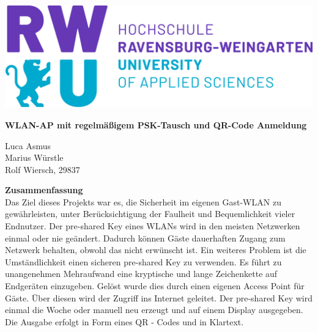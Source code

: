 \documentclass[a4paper,11pt,singlespacing]{article}
\begin{document}
    
 
	\setlength{\parindent}{0ex}
	
    	
    	
\begin{titlepage}
    \begin{center}
    \includegraphics[scale=0.3]{rwu_logo_hor-lila-cyan_rgb_0}
        \vspace*{1.5cm}
        
        \Huge
        \textbf{WLAN-AP mit regelmäßigem PSK-Tausch und QR-Code Anmeldung}
            
        \vspace{1.4cm}
        \normalsize
        Luca Asmus\\ Marius Würstle\\Rolf Wiersch, 29837
            
        \vspace{1.0cm}
        
          \normalsize
        \textbf{Zusammenfassung}\\
    	Das Ziel dieses Projekts war es, die Sicherheit im eigenen Gast-WLAN zu gewährleisten, unter Berücksichtigung der Faulheit und Bequemlichkeit vieler Endnutzer. Der pre-shared Key eines WLANs wird in den meisten Netzwerken einmal oder nie geändert. Dadurch können Gäste dauerhaften Zugang zum Netzwerk behalten, obwohl das nicht erwünscht ist. Ein weiteres Problem ist die Umständlichkeit einen sicheren pre-shared Key zu verwenden. Es führt zu unangenehmen Mehraufwand eine kryptische und lange Zeichenkette auf Endgeräten einzugeben. Gelöst wurde dies durch einen eigenen Access Point für Gäste. Über diesen wird der Zugriff ins Internet geleitet. Der pre-shared Key wird einmal die Woche oder manuell neu erzeugt und auf einem Display ausgegeben. Die Ausgabe erfolgt in Form eines QR - Codes und in Klartext.   \\
        

\end{center}
\end{titlepage}
\end{document}
